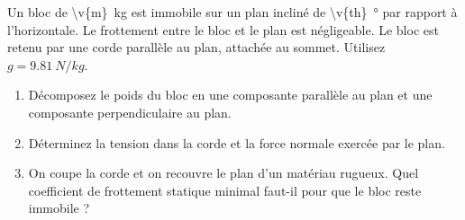 Un bloc de \qty{\v{m}}{kg} est immobile sur un plan incliné de \qty{\v{th}}{\degree} par rapport à l'horizontale. Le frottement entre le bloc et le plan est négligeable. Le bloc est retenu par une corde parallèle au plan, attachée au sommet. Utilisez $g = \qty{9.81}{N/kg}$.

\begin{center}
\end{center}

\begin{enumerate}[label=\alph*)]
    \item Décomposez le poids du bloc en une composante parallèle au plan et une composante perpendiculaire au plan.
    \item Déterminez la tension dans la corde et la force normale exercée par le plan.
    \item On coupe la corde et on recouvre le plan d'un matériau rugueux. Quel coefficient de frottement statique minimal faut-il pour que le bloc reste immobile ?
\end{enumerate}
